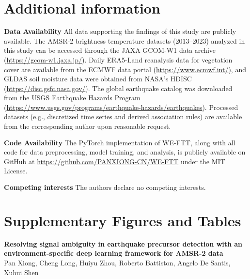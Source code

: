 \documentclass[preprint,review,12pt,authoryear]{elsarticle}
\begin{document}
\section*{Additional information}
\textbf{Data Availability} All data supporting the findings of this study are publicly available. The AMSR-2 brightness temperature datasets (2013--2023) analyzed in this study can be accessed through the JAXA GCOM-W1 data archive (\url{https://gcom-w1.jaxa.jp/}). Daily ERA5-Land reanalysis data for vegetation cover are available from the ECMWF data portal (\url{https://www.ecmwf.int/}), and GLDAS soil moisture data were obtained from NASA's HDISC (\url{https://disc.gsfc.nasa.gov/}). The global earthquake catalog was downloaded from the USGS Earthquake Hazards Program (\url{https://www.usgs.gov/programs/earthquake-hazards/earthquakes}). Processed datasets (e.g., discretized time series and derived association rules) are available from the corresponding author upon reasonable request.

\textbf{Code Availability} The PyTorch implementation of WE-FTT, along with all code for data preprocessing, model training, and analysis, is publicly available on GitHub at \url{https://github.com/PANXIONG-CN/WE-FTT} under the MIT License.

\textbf{Competing interests} The authors declare no competing interests.

\clearpage
\section*{Supplementary Figures and Tables}

\begin{center}
{\Large \textbf{Resolving signal ambiguity in earthquake precursor detection with an environment-specific deep learning framework for AMSR-2 data}}\\[0.75em]
Pan Xiong, Cheng Long, Huiyu Zhou, Roberto Battiston, Angelo De Santis, Xuhui Shen
\end{center}

\vspace{1em}
\end{document}
